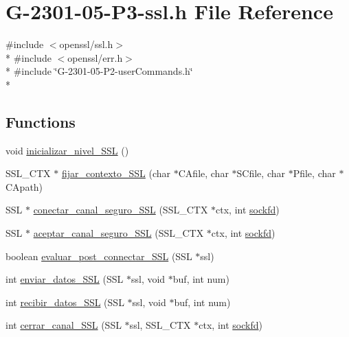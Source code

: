 \hypertarget{_g-2301-05-_p3-ssl_8h}{\section{G-\/2301-\/05-\/\-P3-\/ssl.h File Reference}
\label{_g-2301-05-_p3-ssl_8h}
}
{\ttfamily \#include $<$openssl/ssl.\-h$>$}\\*
{\ttfamily \#include $<$openssl/err.\-h$>$}\\*
{\ttfamily \#include \char`\"{}G-\/2301-\/05-\/\-P2-\/user\-Commands.\-h\char`\"{}}\\*
\subsection*{Functions}
\begin{DoxyCompactItemize}
\item 
void \hyperlink{_g-2301-05-_p3-ssl_8h_a937108af8fd0832377b084e24172ee41}{inicializar\-\_\-nivel\-\_\-\-S\-S\-L} ()
\item 
S\-S\-L\-\_\-\-C\-T\-X $\ast$ \hyperlink{_g-2301-05-_p3-ssl_8h_a84a295d51a23d2558cbf65f436011dc6}{fijar\-\_\-contexto\-\_\-\-S\-S\-L} (char $\ast$C\-Afile, char $\ast$S\-Cfile, char $\ast$Pfile, char $\ast$C\-Apath)
\item 
S\-S\-L $\ast$ \hyperlink{_g-2301-05-_p3-ssl_8h_a79add582c01289f85c0a81569ee3b73e}{conectar\-\_\-canal\-\_\-seguro\-\_\-\-S\-S\-L} (S\-S\-L\-\_\-\-C\-T\-X $\ast$ctx, int \hyperlink{_g-2301-05-_p2-user_tools_8h_ad2c8fb3df3a737e0685e902870a611d2}{sockfd})
\item 
S\-S\-L $\ast$ \hyperlink{_g-2301-05-_p3-ssl_8h_aaeb9457077403f2261ca1a86e3802a1d}{aceptar\-\_\-canal\-\_\-seguro\-\_\-\-S\-S\-L} (S\-S\-L\-\_\-\-C\-T\-X $\ast$ctx, int \hyperlink{_g-2301-05-_p2-user_tools_8h_ad2c8fb3df3a737e0685e902870a611d2}{sockfd})
\item 
boolean \hyperlink{_g-2301-05-_p3-ssl_8h_a8abf144662cb4cfd12428524f425854c}{evaluar\-\_\-post\-\_\-connectar\-\_\-\-S\-S\-L} (S\-S\-L $\ast$ssl)
\item 
int \hyperlink{_g-2301-05-_p3-ssl_8h_a71ed04f7f38be4fd5b1abec30a9ee130}{enviar\-\_\-datos\-\_\-\-S\-S\-L} (S\-S\-L $\ast$ssl, void $\ast$buf, int num)
\item 
int \hyperlink{_g-2301-05-_p3-ssl_8h_a1efb5af79fa6ea71c4d9ceb8f718290f}{recibir\-\_\-datos\-\_\-\-S\-S\-L} (S\-S\-L $\ast$ssl, void $\ast$buf, int num)
\item 
int \hyperlink{_g-2301-05-_p3-ssl_8h_acdbfef38bb502e732928620f71daacd2}{cerrar\-\_\-canal\-\_\-\-S\-S\-L} (S\-S\-L $\ast$ssl, S\-S\-L\-\_\-\-C\-T\-X $\ast$ctx, int \hyperlink{_g-2301-05-_p2-user_tools_8h_ad2c8fb3df3a737e0685e902870a611d2}{sockfd})
\end{DoxyCompactItemize}


